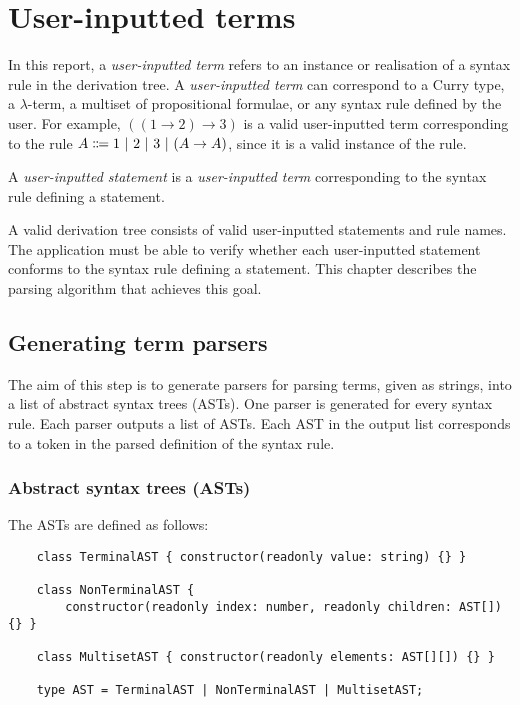 \chapter{User-inputted terms}
\label{chapter:term}
In this report, a \textit{user-inputted term} refers to an instance or realisation of a syntax rule in the derivation tree. A \textit{user-inputted term} can correspond to a Curry type, a $\lambda$-term, a multiset of propositional formulae, or any syntax rule defined by the user. For example, $((1 \to 2) \to 3)$ is a valid user-inputted term corresponding to the rule $A \Coloneqq 1 \ |\  2 \ |\  3 \ |\  (A \to A)$, since it is a valid instance of the rule.

A \textit{user-inputted statement} is a \textit{user-inputted term} corresponding to the syntax rule defining a statement.

A valid derivation tree consists of valid user-inputted statements and rule names. The application must be able to verify whether each user-inputted statement conforms to the syntax rule defining a statement. This chapter describes the parsing algorithm that achieves this goal.

\section{Generating term parsers}
The aim of this step is to generate parsers for parsing terms, given as strings, into a list of abstract syntax trees (ASTs). One parser is generated for every syntax rule. Each parser outputs a list of ASTs. Each AST in the output list corresponds to a token in the parsed definition of the syntax rule.

\subsection{Abstract syntax trees (ASTs)}
The ASTs are defined as follows:
\begin{lstlisting}
    class TerminalAST { constructor(readonly value: string) {} }

    class NonTerminalAST {
        constructor(readonly index: number, readonly children: AST[]) {} }

    class MultisetAST { constructor(readonly elements: AST[][]) {} }

    type AST = TerminalAST | NonTerminalAST | MultisetAST;
\end{lstlisting}

